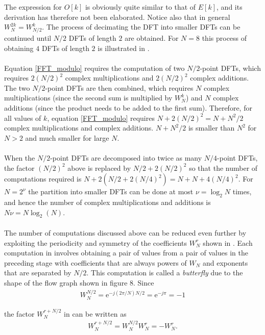 The expression for $O[k]$ is obviously quite similar to that of $E[k]$, and its derivation has therefore not been elaborated. Notice also that in general $W_N^{2k} = W_{N/2}^k$. The process of decimating the DFT into smaller DFTs can be continued until $N/2$ DFTs of length $2$ are obtained. For $N = 8$ this process of obtaining $4$ DFTs of length $2$ is illustrated in \cite{figures 4-9, page 758-761, DTSP}.
\\ \\
Equation \eqref{FFT_modulo} requires the computation of two $N/2$-point DFTs, which requires $2(N/2)^2$ complex multiplications and $2(N/2)^2$ complex additions. The two $N/2$-point DFTs are then combined, which requires $N$ complex multiplications (since the second sum is multiplied by $W_N^k$) and $N$ complex additions (since the product needs to be added to the first sum). Therefore, for all values of $k$, equation \eqref{FFT_modulo} requires $N + 2(N/2)^2 = N + N^2/2$ complex multiplications and complex additions. $N + N^2/2$ is smaller than $N^2$ for $N > 2$ and much smaller for large $N$.
\\ \\
When the $N/2$-point DFTs are decomposed into twice as many $N/4$-point DFTs, the factor $(N/2)^2$ above is replaced by $N/2 + 2(N/2)^2$ so that the number of computations required is $N + 2(N/2+2(N/4)^2) = N + N + 4(N/4)^2$. For $N = 2^\nu$ the partition into smaller DFTs can be done at most $\nu = \log_2 N$ times, and hence the number of complex multiplications and additions is $N \nu = N \log_2 (N)$.
\\ \\
The number of computations discussed above can be reduced even further by exploiting the periodicity and symmetry of the coefficients $W_N^r$ shown in \cite{figure 8, DTSP}. Each computation in \cite{figure 9, DTSP} involves obtaining a pair of values from a pair of values in the preceding stage with coefficients that are always powers of $W_N$ and exponents that are separated by $N/2$. This computation is called a \textit{butterfly} due to the shape of the flow graph shown in figure 8. Since 
\begin{align*}
W_N^{N/2} = \text{e}^{-j(2\pi/N)N/2} = \text{e}^{-j\pi} = -1
\end{align*}

the factor $W_N^{r+N/2}$ in \cite{figure 8, DTSP} can be written as
\begin{align*}
W_N^{r+N/2} = W_N^{N/2} W_N^r = -W_N^r.
\end{align*}

